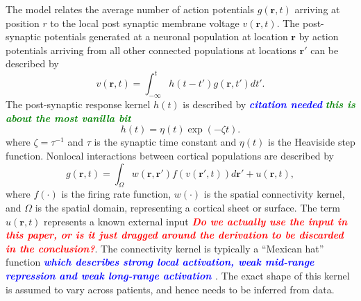 \documentclass[twocolumn,11pt,a4paper]{article}		%
\newcommand{\todo}[1]{\textsf{\emph{\textbf{\textcolor{blue}{#1}}}}}
\newcommand{\wtf}[1]{\textsf{\emph{\textbf{\textcolor{red}{#1}}}}}
\newcommand{\omg}[1]{\textsf{\emph{\textbf{\textcolor{green}{#1}}}}}
\begin{document}
The model relates the average number of action potentials $g(\mathbf{r},t)$ arriving at position $r$ to the local post synaptic membrane voltage $v(\mathbf{r},t)$. The post-synaptic potentials generated at a neuronal population at location $\mathbf{r}$ by action potentials arriving from all other connected populations at locations $\mathbf{r}'$ can be described by 
\begin{equation}
	\label{SpikesToPotential} v\left( {\mathbf{r},t} \right) = \int_{ - \infty }^t {h\left( {t - t'} \right)g\left( {\mathbf{r},t'} \right)dt'}. 
\end{equation}
The post-synaptic response kernel $h(t)$ is described by \todo{citation needed} \omg{this is about the most vanilla bit} 
\begin{equation}
	\label{SynapticRespKernel} h(t) = \eta(t)\exp{\left(-\zeta t\right)}. 
\end{equation}
where $\zeta=\tau^{-1}$ and $\tau$ is the synaptic time constant and $\eta(t)$ is the Heaviside step function. Nonlocal interactions between cortical populations are described by 
\begin{equation}
	\label{RateBasedInteractions} g\left( \mathbf{r},t \right) = \int_\Omega {w\left( \mathbf{r},\mathbf{r}' \right)f\left( v\left( \mathbf{r}',t \right) \right)d\mathbf{r}'} + u\left(\mathbf{r},t\right), 
\end{equation}
where $f(\cdot)$ is the firing rate function, $w(\cdot)$ is the spatial connectivity kernel, and $\Omega$ is the spatial domain, representing a cortical sheet or surface. The term $u\left(\mathbf{r},t\right)$ represents a known external input \wtf{Do we actually use the input in this paper, or is it just dragged around the derivation to be discarded in the conclusion?}. The connectivity kernel is typically a ``Mexican hat'' function \todo{which describes strong local activation, weak mid-range repression and weak long-range activation \cite{}}. The exact shape of this kernel is assumed to vary across patients, and hence needs to be inferred from data. 
\end{document}
